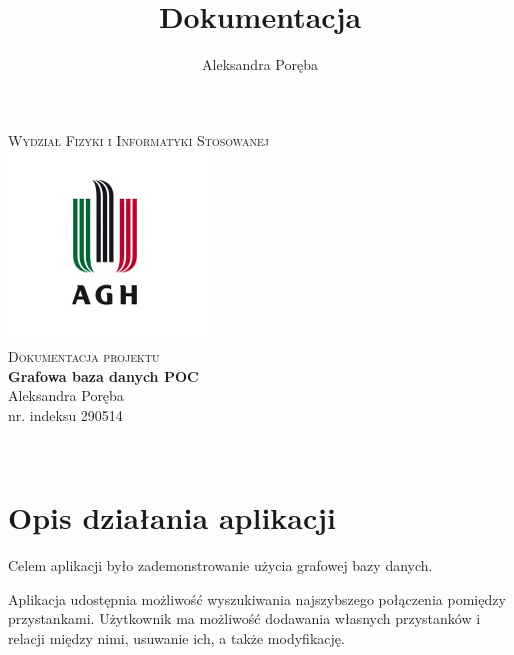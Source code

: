 \documentclass[12pt]{article}
\title{Dokumentacja}
\author{Aleksandra Poręba}
\makeatletter
\let\thetitle\@title
\let\theauthor\@author
\makeatother
\begin{document}
\begin{center}
\textsc{\normalsize Wydział Fizyki i Informatyki Stosowanej}\\[2.0cm] 
\includegraphics[scale = 1]{logo.png}\\[1cm] 
\textsc{\Large Dokumentacja projektu}\\[0.4cm] 

{ \huge \bfseries \LARGE{Grafowa baza danych POC} }\\[1cm] 

\flushright \Large Aleksandra Poręba \\ nr. indeksu 290514

\vfill 

\center {\today}\\[2cm] 

\pagebreak 

\end{center}

\tableofcontents
\pagebreak


\pagestyle{fancy}
\fancyhf{}

\rhead{\theauthor}
\lhead{\thetitle}
\cfoot{\thepage}

\section{Opis działania aplikacji}
Celem aplikacji było zademonstrowanie użycia grafowej bazy danych.

Aplikacja udostępnia możliwość wyszukiwania najszybszego połączenia pomiędzy przystankami. Użytkownik ma możliwość dodawania własnych przystanków i relacji między nimi, usuwanie ich, a także modyfikację.
\end{document}
